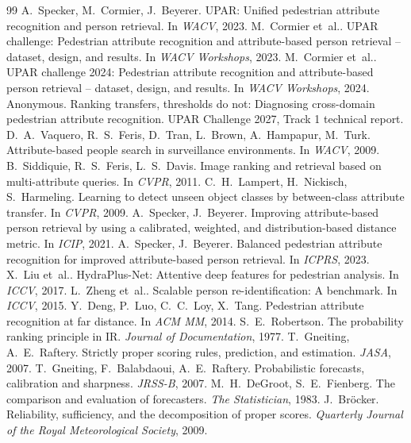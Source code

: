 \documentclass[10pt,twocolumn,letterpaper]{article}
\newcommand{\etal}{et~al.}
\begin{document}
{\small
\begin{thebibliography}{99}\setlength{\itemsep}{0pt}
 A.~Specker, M.~Cormier, J.~Beyerer. UPAR: Unified pedestrian attribute recognition and person retrieval. In \textit{WACV}, 2023.
 M.~Cormier \etal. UPAR challenge: Pedestrian attribute recognition and attribute-based person retrieval -- dataset, design, and results. In \textit{WACV Workshops}, 2023.
 M.~Cormier \etal. UPAR challenge 2024: Pedestrian attribute recognition and attribute-based person retrieval -- dataset, design, and results. In \textit{WACV Workshops}, 2024.
 Anonymous. Ranking transfers, thresholds do not: Diagnosing cross-domain pedestrian attribute recognition. UPAR Challenge 2027, Track 1 technical report.
 D.~A.~Vaquero, R.~S.~Feris, D.~Tran, L.~Brown, A.~Hampapur, M.~Turk. Attribute-based people search in surveillance environments. In \textit{WACV}, 2009.
 B.~Siddiquie, R.~S.~Feris, L.~S.~Davis. Image ranking and retrieval based on multi-attribute queries. In \textit{CVPR}, 2011.
 C.~H.~Lampert, H.~Nickisch, S.~Harmeling. Learning to detect unseen object classes by between-class attribute transfer. In \textit{CVPR}, 2009.
 A.~Specker, J.~Beyerer. Improving attribute-based person retrieval by using a calibrated, weighted, and distribution-based distance metric. In \textit{ICIP}, 2021.
 A.~Specker, J.~Beyerer. Balanced pedestrian attribute recognition for improved attribute-based person retrieval. In \textit{ICPRS}, 2023.
 X.~Liu \etal. HydraPlus-Net: Attentive deep features for pedestrian analysis. In \textit{ICCV}, 2017.
 L.~Zheng \etal. Scalable person re-identification: A benchmark. In \textit{ICCV}, 2015.
 Y.~Deng, P.~Luo, C.~C.~Loy, X.~Tang. Pedestrian attribute recognition at far distance. In \textit{ACM MM}, 2014.
 S.~E.~Robertson. The probability ranking principle in IR. \textit{Journal of Documentation}, 1977.
 T.~Gneiting, A.~E.~Raftery. Strictly proper scoring rules, prediction, and estimation. \textit{JASA}, 2007.
 T.~Gneiting, F.~Balabdaoui, A.~E.~Raftery. Probabilistic forecasts, calibration and sharpness. \textit{JRSS-B}, 2007.
 M.~H.~DeGroot, S.~E.~Fienberg. The comparison and evaluation of forecasters. \textit{The Statistician}, 1983.
 J.~Br\"ocker. Reliability, sufficiency, and the decomposition of proper scores. \textit{Quarterly Journal of the Royal Meteorological Society}, 2009.

\end{thebibliography}}
\end{document}
